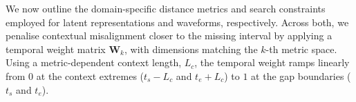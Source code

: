 \documentclass{article}
\begin{document}
We now outline the domain-specific distance metrics and search constraints employed for latent representations and waveforms, respectively. Across both, we penalise contextual misalignment closer to the missing interval by applying a temporal weight matrix $\mathbf{W}_k$,  
with dimensions matching the $k$-th metric space. Using a metric-dependent context length,  $L_{c}$, the temporal weight ramps linearly from $0$ at the context extremes ($t_s - L_c$ and $t_e + L_c$) to $1$ at the gap boundaries ($t_s$ and $t_e$). 




\end{document}
